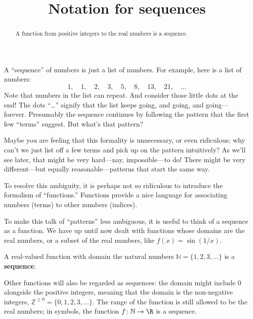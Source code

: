 \documentclass{ximera}
\title{Notation for sequences}
\newcommand{\defnword}[1]{\textbf{#1}}
\newcommand{\ds}{\displaystyle}
\newcommand{\Z}{\mathbb{Z}}
\newcommand{\N}{\mathbb{N}}
\begin{document}
\begin{abstract}
  A function from positive integers to the real numbers is a sequence.
\end{abstract}

\maketitle

A ``sequence'' of numbers is just a list of numbers.  For
example, here is a list of numbers:
$$
1,\quad 1,\quad 2,\quad 3,\quad 5,\quad 8,\quad 13,\quad 21,\quad \ldots
$$
Note that numbers in the list can repeat.  And consider those little
dots at the end!  The dots ``\ldots'' signify that the list keeps
going, and going, and going---forever.  Presumably the sequence
continues by following the pattern that the first few ``terms''
suggest.  But what's that pattern?

\begin{warning}
  Maybe you are feeling that this formality is unnecessary, or even
  ridiculous; why can't we just list off a few terms and pick up on
  the pattern intuitively?  As we'll see later, that might be very
  hard---nay, impossible---to do!  There might be very different---but
  equally reasonable---patterns that start the same way.

  To resolve this ambiguity, it is perhaps not so ridiculous to
  introduce the formalism of ``functions.''  Functions provide a nice
  language for associating numbers (terms) to other numbers
  (indices).
\end{warning}


To make this talk of ``patterns'' less ambiguous, it is useful to
think of a sequence as a function. We have up until now dealt with
functions whose domains are the real numbers, or a subset of the real
numbers, like $f(x)=\sin (1/x)$.

A real-valued function with domain the natural numbers
$\N=\{1,2,3,\ldots\}$ is a \defnword{sequence}.

Other functions will also be regarded as sequences: the domain might
include $0$ alongside the positive integers, meaning that the
domain is the non-negative integers, $\ds
\Z^{\ge0}=\{0,1,2,3,\ldots\}$.  The range of the function is still
allowed to be the real numbers; in symbols, the function $f\colon
\N\to\R$ is a sequence.
\end{document}
